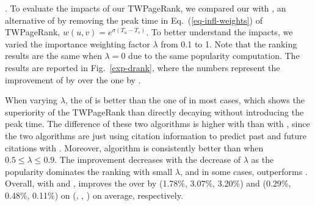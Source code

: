 


\newcommand{\drank}{\kw{DRank}}


.
To evaluate the impacts of our TWPageRank, we compared our \ensemblerank with \drank, an alternative of \ensemblerank by removing the peak time in  Eq.~(\ref{eq-infl-weights}) of  TWPageRank, \ie $w(u,v)=e^{\sigma(T_u-T_v)}$. %
To better understand the impacts, we varied the importance weighting factor $\lambda$ from 0.1 to 1. Note that the ranking results are the same when $\lambda=0$ due to the same popularity computation. The results are reported in Fig.~\ref{exp-drank}, where the numbers represent the improvement of \PairAcc by \ensemblerank over the one by \drank.


When varying $\lambda$, the \PairAcc of \ensemblerank is better than the one of \drank in most cases, which shows the superiority of the TWPageRank than directly decaying without introducing the peak time.
The \PairAcc difference of these two algorithms is higher with \recom than with \fcita, since the two algorithms are just using citation information to predict past and future citations with \fcita.
Moreover, algorithm \ensemblerank is consistently better than \drank when $0.5 \le \lambda \le 0.9$.
The improvement decreases with the decrease of $\lambda$ as the popularity dominates the ranking with small $\lambda$, and in some cases, \drank outperforms \ensemblerank. %
Overall, with \recom and \fcita, \ensemblerank improves the \PairAcc over \drank by (1.78\%, 3.07\%, 3.20\%) and (0.29\%, 0.48\%, 0.11\%) on (\aan, \aminer, \magdata) on average, respectively.

